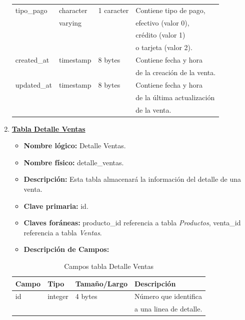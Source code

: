 \documentclass[letterpaper,12pt]{article}
\begin{document}
\begin{enumerate}
\begin{center}
\begin{table}
\begin{tabular}{|l|l|l|l|}
tipo\_pago & character &1 caracter &Contiene tipo de pago, \\
\mbox{} & varying & &efectivo (valor 0),\\
\mbox{} & \mbox{} & &crédito (valor 1)\\
\mbox{} & \mbox{} & &o tarjeta (valor 2).\\

\hline
created\_at& timestamp & 8 bytes &Contiene fecha y hora\\
\mbox{} & \mbox{} & &de la creación de la venta.\\
\hline
updated\_at& timestamp & 8 bytes &Contiene fecha y hora\\
\mbox{} & \mbox{} & &de la última actualización\\
\mbox{} & \mbox{} & &de la venta.\\
\hline

\end{tabular}

\end{table}

\end{center}

\newpage

\item \textbf{\underline{Tabla Detalle Ventas}}
\begin{itemize}
\item \textbf{Nombre lógico:} Detalle Ventas.
\item \textbf{Nombre físico:} detalle\_ventas.
\item \textbf{Descripción:} Esta tabla almacenará la información del detalle de una venta.
\item \textbf{Clave primaria:} id.
\item \textbf{Claves foráneas:} producto\_id referencia a tabla \emph{Productos}, venta\_id referencia a tabla \emph{Ventas}.
\item\textbf{Descripción de Campos:}
\end{itemize}

\begin{table}[!ht]
\caption{Campos tabla Detalle Ventas}
\begin{center}
\begin{tabular}{|l|l|l|l|}
\hline
\textbf{Campo} \hspace*{2cm} & \textbf{Tipo} & \textbf{Tamaño/Largo} & \textbf{Descripción} \hspace*{3,5cm} \\
\hline
id & integer & 4 bytes&Número que identifica \\ 
\mbox{} & \mbox{} & &a una linea de detalle.\\
\hline


\end{tabular}
\end{center}
\end{table}
\end{enumerate}
\end{document}
